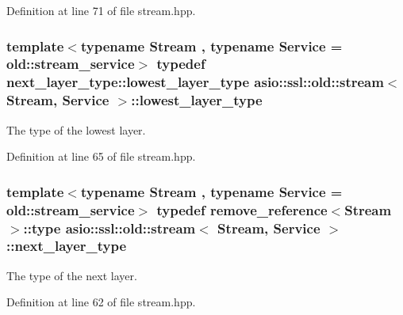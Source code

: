Definition at line 71 of file stream.\+hpp.

\hypertarget{classasio_1_1ssl_1_1old_1_1stream_a6b664149066b698269db4e2f4e846ca2}{}
\subsubsection[{lowest\+\_\+layer\+\_\+type}]{\setlength{\rightskip}{0pt plus 5cm}template$<$typename Stream , typename Service  = old\+::stream\+\_\+service$>$ typedef next\+\_\+layer\+\_\+type\+::lowest\+\_\+layer\+\_\+type {\bf asio\+::ssl\+::old\+::stream}$<$ Stream, Service $>$\+::{\bf lowest\+\_\+layer\+\_\+type}}\label{classasio_1_1ssl_1_1old_1_1stream_a6b664149066b698269db4e2f4e846ca2}


The type of the lowest layer. 



Definition at line 65 of file stream.\+hpp.

\hypertarget{classasio_1_1ssl_1_1old_1_1stream_a71ae7adcbd44cae6750157541c2ddf8e}{}
\subsubsection[{next\+\_\+layer\+\_\+type}]{\setlength{\rightskip}{0pt plus 5cm}template$<$typename Stream , typename Service  = old\+::stream\+\_\+service$>$ typedef remove\+\_\+reference$<$Stream$>$\+::type {\bf asio\+::ssl\+::old\+::stream}$<$ Stream, Service $>$\+::{\bf next\+\_\+layer\+\_\+type}}\label{classasio_1_1ssl_1_1old_1_1stream_a71ae7adcbd44cae6750157541c2ddf8e}


The type of the next layer. 



Definition at line 62 of file stream.\+hpp.

\hypertarget{classasio_1_1ssl_1_1old_1_1stream_a2e027ffad5f6a2acd99689211e717ac5}{}
